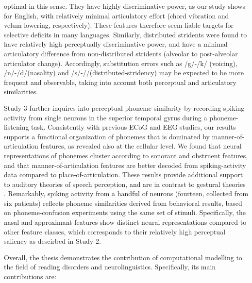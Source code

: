 optimal in this sense. They have highly discriminative power, as our study shows for English, with relatively minimal articulatory effort (chord vibration and velum lowering, respectively). These features therefore seem liable targets for selective deficits in many languages. Similarly, distributed stridents were found to have relatively high perceptually discriminative power, and have a minimal articulatory difference from non-distributed stridents (alveolar to post-alveolar articulator change). Accordingly, substitution errors such as /g/-/k/ (voicing), /n/-/d/(nasality) and /s/-//(distributed-stridency) may be expected to be more frequent and observable, taking into account both perceptual and articulatory similarities.

Study 3 further inquires into perceptual phoneme similarity by recording spiking activity from single neurons in the superior temporal gyrus during a phoneme-listening task. Consistently with previous ECoG and EEG studies, our results supports a functional organization of phonemes that is dominated by manner-of-articulation features, as revealed also at the cellular level. We found that neural representations of phonemes cluster according to sonorant and obstruent features, and that manner-of-articulation features are better decoded from spiking-activity data compared to place-of-articulation. These results provide additional support to auditory theories of speech perception, and are in contrast to gestural theories \citep{liberman1985motor, browman1992articulatory}. Remarkably, spiking activity from a handful of neurons (fourteen, collected from six patients) reflects phoneme similarities derived from behavioral results, based on phoneme-confusion experiments using the same set of stimuli. Specifically, the nasal and approximant features show distinct neural representations compared to other feature classes, which corresponds to their relatively high perceptual saliency as descirbed in Study 2. 

Overall, the thesis demonstrates the contribution of computational modelling to the field of reading disorders and neurolinguistics. Specifically, its main contributions are:


